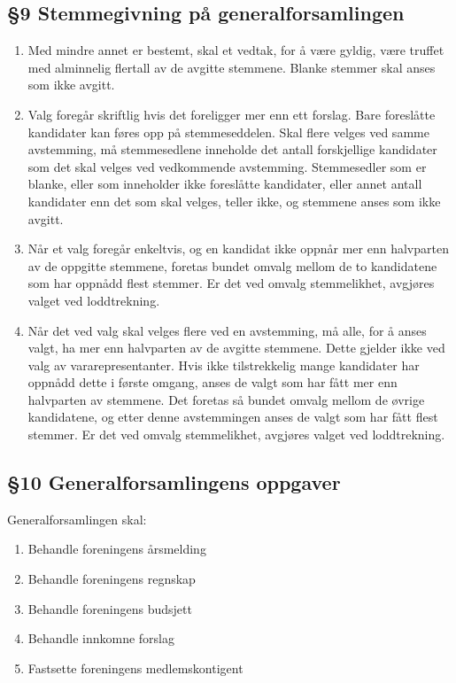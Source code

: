 \documentclass[a4paper,11pt,titlepage]{article}
\begin{document}
\subsection*{§9 Stemmegivning på generalforsamlingen}

\begin{enumerate}

\item Med mindre annet er bestemt, skal et vedtak, for å være gyldig, være truffet med alminnelig flertall av de avgitte stemmene. Blanke stemmer skal anses som ikke avgitt.

\item Valg foregår skriftlig hvis det foreligger mer enn ett forslag. Bare foreslåtte kandidater kan føres opp på stemmeseddelen. Skal flere velges ved samme avstemming, må stemmesedlene inneholde det antall forskjellige kandidater som det skal velges ved vedkommende avstemming. Stemmesedler som er blanke, eller som inneholder ikke foreslåtte kandidater, eller annet antall kandidater enn det som skal velges, teller ikke, og stemmene anses som ikke avgitt.

\item Når et valg foregår enkeltvis, og en kandidat ikke oppnår mer enn halvparten av de oppgitte stemmene, foretas bundet omvalg mellom de to kandidatene som har oppnådd flest stemmer. Er det ved omvalg stemmelikhet, avgjøres valget ved loddtrekning.

\item Når det ved valg skal velges flere ved en avstemming, må alle, for å anses valgt, ha mer enn halvparten av de avgitte stemmene. Dette gjelder ikke ved valg av vararepresentanter. Hvis ikke tilstrekkelig mange kandidater har oppnådd dette i første omgang, anses de valgt som har fått mer enn halvparten av stemmene. Det foretas så bundet omvalg mellom de øvrige kandidatene, og etter denne avstemmingen anses de valgt som har fått flest stemmer. Er det ved omvalg stemmelikhet, avgjøres valget ved loddtrekning.

\end{enumerate}

\subsection*{§10 Generalforsamlingens oppgaver}
Generalforsamlingen skal:

\begin{enumerate}

\item Behandle foreningens årsmelding
\item Behandle foreningens regnskap
\item Behandle foreningens budsjett
\item Behandle innkomne forslag
\item Fastsette foreningens medlemskontigent

\end{enumerate}
\end{document}
